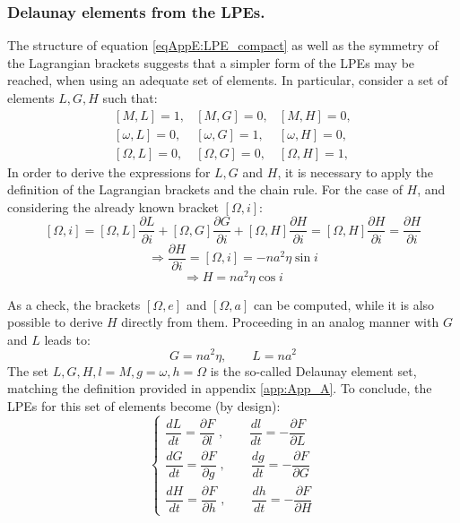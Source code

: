 		\subsubsection{Delaunay elements from the LPEs.}\label{secAppE:Delaunay}
		\indent The structure of equation \eqref{eqAppE:LPE_compact} as well as the symmetry of the Lagrangian brackets suggests that a simpler form of the LPEs may be reached, when using an adequate set of elements. In particular, consider a set of elements $L, G, H$ such that:
		\begin{equation}
		\begin{array}{ccc}
		\left[M, L\right] = 1, 			& \left[M, G\right] = 0,		&  \left[M, H\right] = 0, \\
		\left[\omega, L\right] = 0, 	& \left[\omega, G\right] = 1,	&  \left[\omega, H\right] = 0, \\		
		\left[\Omega, L\right] = 0, 	& \left[\Omega, G\right] = 0,	&  \left[\Omega, H\right] = 1, 				
		\end{array}
		\label{eqAppE:Delaunay_1}
		\end{equation}
		\indent In order to derive the expressions for $L, G$ and $H$, it is necessary to apply the definition of the Lagrangian brackets and the chain rule. For the case of $H$, and considering the already known bracket $[\Omega, i]$:
		\[
		[\Omega, i] = [\Omega, L] \dfrac{\partial L}{\partial i} + [\Omega, G] \dfrac{\partial G}{\partial i} + [\Omega, H] \dfrac{\partial H}{\partial i} = [\Omega, H] \dfrac{\partial H}{\partial i} = \dfrac{\partial H}{\partial i}
		\]
		\[\Rightarrow \dfrac{\partial H}{\partial i} = [\Omega, i] = -na^2 \eta \sin i\]
		\[\Rightarrow H = na^2\eta \cos i\]
		
		\indent As a check, the brackets $[\Omega, e]$ and $[\Omega, a]$ can be computed, while it is also possible to derive $H$ directly from them. Proceeding in an analog manner with $G$ and $L$ leads to:
		\[G = na^2\eta, \qquad L = na^2\]
		\indent The set $L, G, H, l = M, g = \omega, h = \Omega$ is the so-called Delaunay element set, matching the definition provided in appendix \ref{app:App_A}. To conclude, the LPEs for this set of elements become (by design):
		\begin{equation}
		\left\{ \begin{array}{ccc}
		\dfrac{dL}{dt} = \dfrac{\partial F}{\partial l}\; , \qquad \dfrac{dl}{dt} = - \dfrac{\partial F}{\partial L} \\[1.2em]
		\dfrac{dG}{dt} = \dfrac{\partial F}{\partial g}\; , \qquad \dfrac{dg}{dt} = - \dfrac{\partial F}{\partial G} \\[1.2em]
		\dfrac{dH}{dt} = \dfrac{\partial F}{\partial h}\; , \qquad \dfrac{dh}{dt} = - \dfrac{\partial F}{\partial H}
		\end{array}\right. 
		\label{eqAppE:LPE_DOE}
		\end{equation}
